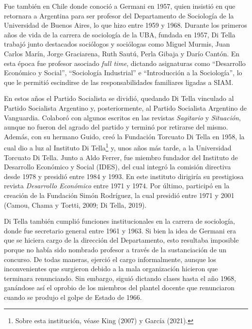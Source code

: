 Fue también en Chile donde conoció a Germani en 1957, quien insistió en que retornara a Argentina para ser profesor del Departamento de Sociología de la Universidad de Buenos Aires, lo que hizo entre 1959 y 1968. Durante los primeros años de vida de la carrera de sociología de la UBA, fundada en 1957, Di Tella trabajó junto destacados sociólogos y sociólogas como Miguel Murmis, Juan Carlos Marín, Jorge Graciarena, Ruth Sautú, Perla Gibaja y Darío Cantón. En esta época fue profesor asociado \emph{full time}, dictando asignaturas como \enquote{Desarrollo Económico y Social}, \enquote{Sociología Industrial} e \enquote{Introducción a la Sociología}, lo que le permitió escindirse de las responsabilidades familiares ligadas a SIAM.

En estos años el Partido Socialista se dividió, quedando Di Tella vinculado al Partido Socialista Argentino y, posteriormente, al Partido Socialista Argentino de Vanguardia. Colaboró con algunos escritos en las revistas \emph{Sagitario} y \emph{Situación}, aunque no fueron del agrado del partido y terminó por retirarse del mismo. Además, con su hermano Guido, creó la Fundación Torcuato Di Tella en 1958, la cual dio a luz al Instituto Di Tella\footnote{Sobre esta institución, véase King (2007) y García (2021).} y, unos años más tarde, a la Universidad Torcuato Di Tella. Junto a Aldo Ferrer, fue miembro fundador del Instituto de Desarrollo Económico y Social (IDES), del cual integró la comisión directiva desde 1978 y presidió entre 1984 y 1993. En este instituto dirigiría su prestigiosa revista \emph{Desarrollo Económico} entre 1971 y 1974. Por último, participó en la creación de la Fundación Simón Rodríguez, la cual presidió entre 1971 y 2001 (Camou, Chama y Tortti, 2009; Di Tella, 2019).

Di Tella también cumplió funciones institucionales en la carrera de sociología, donde fue secretario general entre 1961 y 1963. Si bien la idea de Germani era que se hiciera cargo de la dirección del Departamento, esto resultaba imposible porque no había sido nombrado profesor a través de la sustanciación de un concurso. De todas maneras, ejerció el cargo informalmente, aunque los inconvenientes que surgieron debido a la mala organización hicieron que terminara renunciando. Sin embargo, siguió dictando clases hasta el año 1968, ganándose así el oprobio de los miembros del plantel docente que renunciaron cuando se produjo el golpe de Estado de 1966.

